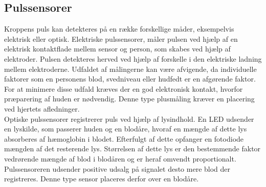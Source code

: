 \subsection{Pulssensorer}\label{sec:pulssensor}
Kroppens puls kan detekteres på en række forskellige måder, eksempelvis elektrisk eller optisk. Elektriske pulssensorer, måler pulsen ved hjælp af en elektrisk kontaktflade mellem sensor og person, som skabes ved hjælp af elektroder. Pulsen detekteres herved ved hjælp af forskelle i den elektriske ladning mellem elektroderne. Udfaldet af målingerne kan være afvigende, da individuelle faktorer som en personens blod, svedniveau eller hudfedt er en afgørende faktor. For at minimere disse udfald kræves der en god elektronisk kontakt, hvorfor præparering af huden er nødvendig. Denne type plusmåling kræver en placering ved hjertets afledninger. \citep{PhuaLissorguesMercier2009}  \\
Optiske pulssensorer registrerer puls ved hjælp af lysindhold. En LED udsender en lyskilde, som passerer huden og en blodåre, hvoraf en mængde af dette lys absorberes af hæmoglobin i blodet. Efterfulgt af dette opfanger en fotodiode mængden af det resterende lys. Størrelsen af dette lys er den bestemmende faktor vedrørende mængde af blod i blodåren og er heraf omvendt proportionalt. Pulssensoreren udsender positive udsalg på signalet desto mere blod der registreres. Denne type sensor placeres derfor over en blodåre. \citep{PhuaLissorguesMercier2009,SrinivasReddySrinivas2006} 
%
%
